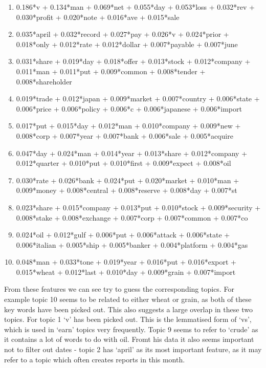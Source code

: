 \documentclass{article}
\begin{document}
\begin{enumerate}
\item 0.186*v + 0.134*man + 0.069*net + 0.055*day + 0.053*loss + 0.032*rev + 0.030*profit + 0.020*note + 0.016*ave + 0.015*sale
\item 0.035*april + 0.032*record + 0.027*pay + 0.026*v + 0.024*prior + 0.018*only + 0.012*rate + 0.012*dollar + 0.007*payable + 0.007*june
\item 0.031*share + 0.019*day + 0.018*offer + 0.013*stock + 0.012*company + 0.011*man + 0.011*put + 0.009*common + 0.008*tender + 0.008*shareholder
\item 0.019*trade + 0.012*japan + 0.009*market + 0.007*country + 0.006*state + 0.006*price + 0.006*policy + 0.006*c + 0.006*japanese + 0.006*import
\item 0.017*put + 0.015*day + 0.012*man + 0.010*company + 0.009*new + 0.008*corp + 0.007*year + 0.007*bank + 0.006*sale + 0.005*acquire
\item 0.047*day + 0.024*man + 0.014*year + 0.013*share + 0.012*company + 0.012*quarter + 0.010*put + 0.010*first + 0.009*expect + 0.008*oil
\item 0.030*rate + 0.026*bank + 0.024*put + 0.020*market + 0.010*man + 0.009*money + 0.008*central + 0.008*reserve + 0.008*day + 0.007*st
\item 0.023*share + 0.015*company + 0.013*put + 0.010*stock + 0.009*security + 0.008*stake + 0.008*exchange + 0.007*corp + 0.007*common + 0.007*co
\item 0.024*oil + 0.012*gulf + 0.006*put + 0.006*attack + 0.006*state + 0.006*italian + 0.005*ship + 0.005*banker + 0.004*platform + 0.004*gas
\item 0.048*man + 0.033*tone + 0.019*year + 0.016*put + 0.016*export + 0.015*wheat + 0.012*last + 0.010*day + 0.009*grain + 0.007*import
\end{enumerate}

From these features we can see try to guess the corresponding topics. For example topic 10 seems to be related to either wheat or grain, as both of these key words have been picked out. This also suggests a large overlap in these two topics. For topic 1 `v' has been picked out. This is the lemmatised form of `vs', which is used in `earn' topics very frequently. Topic 9 seems to refer to `crude' as it contains a lot of words to do with oil. Fromt his data it also seems important not to filter out dates - topic 2 has `april' as its most important feature, as it may refer to a topic which often creates reports in this month.
\end{document}
